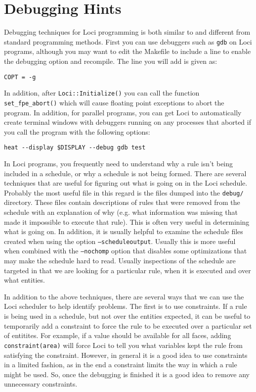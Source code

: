 \documentclass[10pt,epsf,letterpaper,twoside]{book}
\begin{document}
\chapter{Debugging Hints}

Debugging techniques for Loci programming is both similar to and
different from standard programming methods.  First you can use
debuggers such as {\tt gdb} on Loci programs, although you may want to
edit the Makefile to include a line to enable the debugging option and
recompile.  The line you will add is given as:
\begin{verbatim}
COPT = -g
\end{verbatim}
In addition, after {\tt Loci::Initialize()} you can call the function
{\tt set\_fpe\_abort()} which will cause floating point exceptions to
abort the program.  In addition, for parallel programs, you can get
Loci to automatically create terminal windows with debuggers running
on any processes that aborted if you call the program with the
following options:
\begin{verbatim}
heat --display $DISPLAY --debug gdb test
\end{verbatim}

In Loci programs, you frequently need to understand why a rule isn't
being included in a schedule, or why a schedule is not being formed.
There are several techniques that are useful for figuring out what is
going on in the Loci schedule.  Probably the most useful file in this
regard is the files dumped into the {\tt debug/} directory.  These
files contain descriptions of rules that were removed from the
schedule with an explanation of why ({e.g.} what information was
missing that made it impossible to execute that rule).  This is often
very useful in determining what is going on.  In addition, it is
usually helpful to examine the schedule files created when using the
option {\tt --scheduleoutput}.  Usually this is more useful when
combined with the {\tt --nochomp} option that disables some
optimizations that may make the schedule hard to read.  Usually
inspections of the schedule are targeted in that we are looking for a
particular rule, when it is executed and over what entities.

In addition to the above techniques, there are several ways that we
can use the Loci scheduler to help identify problems.  The first is to
use constraints.  If a rule is being used in a schedule, but not over
the entities expected, it can be useful to temporarily add a
constraint to force the rule to be executed over a particular set of
entitites.  For example, if a value should be available for all faces,
adding {\tt constraint(area)} will force Loci to tell you what
variables kept the rule from satisfying the constraint.  However, in
general it is a good idea to use constraints in a limited fashion, as
in the end a constraint limits the way in which a rule might be used.
So, once the debugging is finished it is a good idea to remove any
unnecessary constraints. 
\end{document}
